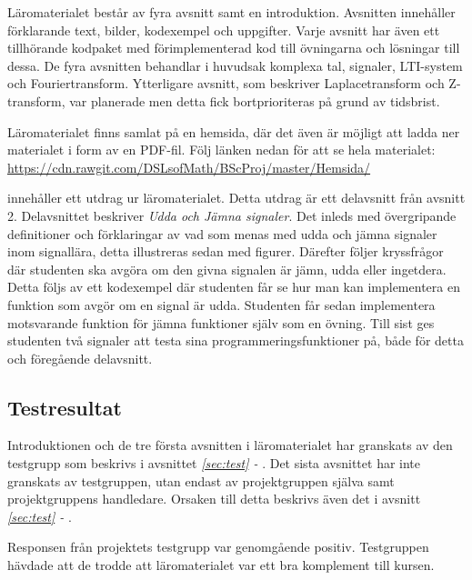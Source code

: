 \documentclass[12pt,a4paper,twoside,openright]{article}
\begin{document}
Läromaterialet består av fyra avsnitt samt en introduktion. Avsnitten
innehåller förklarande text, bilder, kodexempel och uppgifter. Varje
avsnitt har även ett tillhörande kodpaket med förimplementerad kod
till övningarna och lösningar till dessa. De fyra avsnitten behandlar
i huvudsak komplexa tal, signaler, LTI-system och Fouriertransform.
Ytterligare avsnitt, som beskriver Laplacetransform och Z-transform,
var planerade men detta fick bortprioriteras på grund av tidsbrist.

Läromaterialet finns samlat på en hemsida, där det även är möjligt att
ladda ner materialet i form av en PDF-fil. Följ länken nedan för att
se hela materialet:
\url{https://cdn.rawgit.com/DSLsofMath/BScProj/master/Hemsida/}

 innehåller ett utdrag ur läromaterialet. Detta utdrag
är ett delavsnitt från avsnitt 2. Delavsnittet beskriver \textit{Udda
  och Jämna signaler}. Det inleds med övergripande definitioner och
förklaringar av vad som menas med udda och jämna signaler inom
signallära, detta illustreras sedan med figurer. Därefter följer
kryssfrågor där studenten ska avgöra om den givna signalen är jämn,
udda eller ingetdera. Detta följs av ett kodexempel där studenten får
se hur man kan implementera en funktion som avgör om en signal är
udda. Studenten får sedan implementera motsvarande funktion för jämna
funktioner själv som en övning. Till sist ges studenten två signaler
att testa sina programmeringsfunktioner på, både för detta och
föregående delavsnitt.


\subsection{Testresultat}
\label{sec:testResultat}
Introduktionen och de tre första avsnitten i läromaterialet har
granskats av den testgrupp som beskrivs i avsnittet
\textit{\ref{sec:test} - }. Det sista avsnittet har
inte granskats av testgruppen, utan endast av projektgruppen själva
samt projektgruppens handledare. Orsaken till detta beskrivs även det
i avsnitt \textit{\ref{sec:test} - }.

Responsen från projektets testgrupp var genomgående
positiv. Testgruppen hävdade att de trodde att läromaterialet var ett
bra komplement till kursen.
\end{document}
